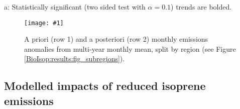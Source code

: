\documentclass[acp, manuscript]{copernicus}
\newcommand{\mypic}[3]{%
  \begin{figure}
    \texttt{[image: \#1]}
    \caption{#2}
    #3
  \end{figure}
}
\begin{document}
\begin{table}
\begin{threeparttable}
\begin{tabular}{ l | c  c }
          \bottomrule
        \end{tabular}
        \begin{tablenotes} 
          \small
          \item a: Statistically significant (two sided test with $\alpha=0.1$) trends are bolded.
        \end{tablenotes}
        \label{BioIsop:results:trends:tab_trends}
      \end{threeparttable}\end{table}
      
      
      \mypic{Figures/new_emiss/trend_isop.png}{%
        A priori (row 1) and a posteriori (row 2) monthly emissions anomalies from multi-year monthly mean, split by region (see Figure \ref{BioIsop:results:fig_subregions}).
      }{\label{BioIsop:results:new_emiss:trends:fig_emission_anomalies}}
   
  \subsection{Modelled impacts of reduced isoprene emissions}
    \label{BioIsop:results:new_emiss}
    
\end{document}
